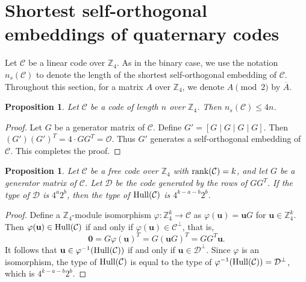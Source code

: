 \documentclass{article}
\newtheorem{proposition}[theorem]{Proposition}
\theoremstyle{definition}
\theoremstyle{remark}
\begin{document}
\section{Shortest self-orthogonal embeddings of quaternary codes}
Let $\mathcal{C}$ be a linear code over $\mathbb{Z}_4$. As in the binary case, we use the notation $n_s(\mathcal{C})$ to denote the length of the shortest self-orthogonal embedding of $\mathcal{C}$. Throughout this section, for a matrix $A$ over $\mathbb{Z}_4$, we denote $A\pmod 2$ by $\overline{A}$.

\begin{proposition}\label{trivialembedding}
    Let $\mathcal{C}$ be a code of length $n$ over $\mathbb{Z}_4$. Then $n_s(\mathcal{C})\le 4n$.
\end{proposition}
\begin{proof}
    Let $G$ be a generator matrix of $\mathcal{C}$. Define $G'=[G\mid G\mid G\mid G]$. Then $(G')(G')^T=4\cdot GG^T=\mathcal{O}$. Thus $G'$ generates a self-orthogonal embedding of $\mathcal{C}$. This completes the proof.
\end{proof}

\begin{proposition}\label{Hull-type}
    Let $\mathcal{C}$ be a free code over $\mathbb{Z}_4$ with ${\rm{rank}}(\mathcal{C})=k$, and let $G$ be a generator matrix of $\mathcal{C}$. Let $\mathcal{D}$ be the code generated by the rows of $GG^T$. If the type of $\mathcal{D}$ is $4^a2^b$, then the type of ${\rm{Hull}}(\mathcal{C})$ is $4^{k-a-b}2^b$.
\end{proposition}
\begin{proof}
    Define a $\mathbb{Z}_4$-module isomorphism $\varphi:\mathbb{Z}_4^k\to \mathcal{C}$ as $\varphi(\mathbf{u})=\mathbf{u}G$ for $\mathbf{u}\in\mathbb{Z}_4^k$. Then $\varphi(\mathbf{u})\in{\rm{Hull}}(\mathcal{C})$ if and only if $\varphi(\mathbf{u})\in\mathcal{C}^\perp$, that is,
    \[
    \mathbf{0}=G\varphi(\mathbf{u})^T=G(\mathbf{u}G)^T=GG^T\mathbf{u}.
    \]
    It follows that $\mathbf{u}\in\varphi^{-1}({\rm{Hull}}(\mathcal{C}))$ if and only if $\mathbf{u}\in\mathcal{D}^\perp$. Since $\varphi$ is an isomorphism, the type of ${\rm{Hull}}(\mathcal{C})$ is equal to the type of $\varphi^{-1}({\rm{Hull}}(\mathcal{C}))=\mathcal{D}^\perp$, which is $4^{k-a-b}2^b$.
\end{proof}
\end{document}
